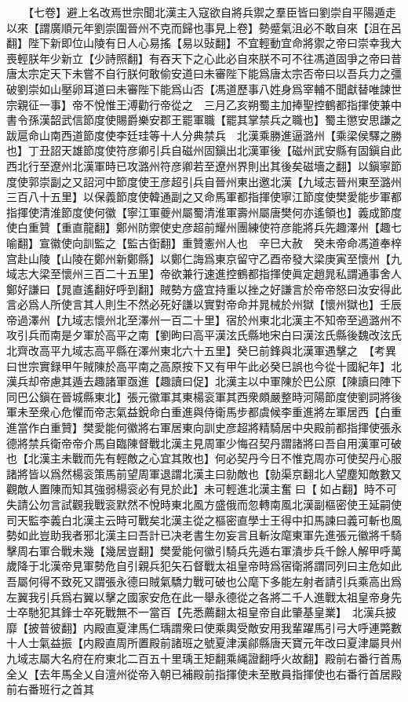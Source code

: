 　　【七卷】避上名改焉世宗聞北漢主入寇欲自將兵禦之羣臣皆曰劉崇自平陽遁走以來【謂廣順元年劉崇圍晉州不克而歸也事見上卷】勢蹙氣沮必不敢自來【沮在呂翻】陛下新即位山陵有日人心易搖【易以䜴翻】不宜輕動宜命將禦之帝曰崇幸我大喪輕朕年少新立【少詩照翻】有吞天下之心此必自來朕不可不往馮道固爭之帝曰昔唐太宗定天下未嘗不自行朕何敢偷安道曰未審陛下能爲唐太宗否帝曰以吾兵力之彊破劉崇如山壓卵耳道曰未審陛下能爲山否【馮道歷事八姓身爲宰輔不聞獻替唯諫世宗親征一事】帝不悅惟王溥勸行帝從之　三月乙亥朔蜀主加捧聖控鶴都指揮使兼中書令孫漢韶武信節度使賜爵樂安郡王罷軍職【罷其掌禁兵之職也】蜀主懲安思謙之跋扈命山南西道節度使李廷珪等十人分典禁兵　北漢乘勝進逼潞州【乘梁侯驛之勝也】丁丑詔天雄節度使符彦卿引兵自磁州固鎭出北漢軍後【磁州武安縣有固鎭自此西北行至遼州北漢軍時已攻潞州符彦卿若至遼州界則出其後矣磁墻之翻】以鎭寧節度使郭崇副之又詔河中節度使王彦超引兵自晉州東出邀北漢【九域志晉州東至潞州三百八十五里】以保義節度使韓通副之又命馬軍都指揮使寧江節度使樊愛能步軍都指揮使清淮節度使何徽【寧江軍夔州屬蜀清淮軍壽州屬唐樊何亦遙領也】義成節度使白重贊【重直龍翻】鄭州防禦使史彦超前耀州團練使符彦能將兵先趣澤州【趣七喻翻】宣徽使向訓監之【監古衘翻】重贊憲州人也　辛巳大赦　癸未帝命馮道奉梓宫赴山陵【山陵在鄭州新鄭縣】以鄭仁誨爲東京留守乙酉帝發大梁庚寅至懷州【九域志大梁至懷州三百二十五里】帝欲兼行速進控鶴都指揮使眞定趙晁私謂通事舍人鄭好謙曰【晁直遙翻好呼到翻】賊勢方盛宜持重以挫之好謙言於帝帝怒曰汝安得此言必爲人所使言其人則生不然必死好謙以實對帝命并晁械於州獄【懷州獄也】壬辰帝過澤州【九域志懷州北至澤州一百二十里】宿於州東北北漢主不知帝至過潞州不攻引兵而南是夕軍於高平之南【劉昫曰高平漢泫氏縣地宋白曰漢泫氏縣後魏改泫氏北齊改高平九域志高平縣在澤州東北六十五里】癸巳前鋒與北漢軍遇擊之　【考異曰世宗實録甲午賊陳於高平南之高原按下又有甲午此必癸巳誤也今從十國紀年】北漢兵却帝慮其遁去趣諸軍亟進【趣讀曰促】北漢主以中軍陳於巴公原【陳讀曰陣下同巴公鎭在晉城縣東北】張元徽軍其東楊衮軍其西衆頗嚴整時河陽節度使劉詞將後軍未至衆心危懼而帝志氣益銳命白重進與侍衛馬步都虞候李重進將左軍居西【白重進當作白重贊】樊愛能何徽將右軍居東向訓史彦超將精騎居中央殿前都指揮使張永德將禁兵衛帝帝介馬自臨陳督戰北漢主見周軍少悔召契丹謂諸將曰吾自用漢軍可破也【北漢主未戰而先有輕敵之心宜其敗也】何必契丹今日不惟克周亦可使契丹心服諸將皆以爲然楊衮策馬前望周軍退謂北漢主曰勍敵也【勍渠京翻北人望塵知敵數又觀敵人置陳而知其強弱楊衮必有見於此】未可輕進北漢主奮曰【如占翻】時不可失請公勿言試觀我戰衮默然不悅時東北風方盛俄而忽轉南風北漢副樞密使王延嗣使司天監李義白北漢主云時可戰矣北漢主從之樞密直學士王得中扣馬諫曰義可斬也風勢如此豈助我者邪北漢主曰吾計已决老書生勿妄言且斬汝麾東軍先進張元徽將千騎擊周右軍合戰未幾【幾居豈翻】樊愛能何徽引騎兵先遁右軍潰步兵千餘人解甲呼萬歲降于北漢帝見軍勢危自引親兵犯矢石督戰太祖皇帝時爲宿衛將謂同列曰主危如此吾屬何得不致死又謂張永德曰賊氣驕力戰可破也公麾下多能左射者請引兵乘高出爲左翼我引兵爲右翼以擊之國家安危在此一舉永德從之各將二千人進戰太祖皇帝身先士卒馳犯其鋒士卒死戰無不一當百【先悉薦翻太祖皇帝自此肇基皇業】　北漢兵披靡【披普彼翻】内殿直夏津馬仁瑀謂衆曰使乘輿受敵安用我輩躍馬引弓大呼連斃數十人士氣益振【内殿直周所置殿前諸班之號夏津漢鄃縣唐天寶元年改曰夏津屬貝州九域志屬大名府在府東北二百五十里瑀王矩翻乘䋲證翻呼火故翻】殿前右番行首馬全乂【去年馬全乂自澶州從帝入朝已補殿前指揮使未至散員指揮使也右番行首居殿前右番班行之首其